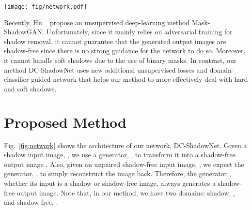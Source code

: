 \documentclass[10pt,twocolumn,letterpaper]{article}
\begin{document}
\begin{figure*}
	\vspace{-0.1in}
	\begin{center}
		\captionsetup[subfigure]{labelformat=empty}
		{\texttt{[image: fig/network.pdf]}}
		\vspace{-0.125in}
	\end{center}
	\vspace{-0.15in}
	\caption{\textbf{Network Architecture of Our DC-ShadowNet.} 
		We have two domains: shadow, , and shadow-free, . Our shadow removal generator is represented by . It consists of an encoder , a decoder , and a domain classifier . 
We also use a discriminator  that consists of its own encoder , a classifier  and a domain classifier .
For the input shadow image , its corresponding output shadow-free image is represented by . 
Also, for the unpaired input shadow-free image ,  reconstruct the image back.
		The domain classifiers,  and , are used to classify whether the inputs to their respective networks,  and , belong to shadow () or shadow-free () domain.
To guide our generator  to do shadow removal, other than adversarial loss from the discriminator , we include novel losses: shadow-free chromaticity loss  (purple) guided by the physics-based shadow-free chromaticity  obtained from ; shadow-robust feature loss  (red) guided by the shadow-robust perceptual features  obtained from , and boundary smoothness loss  (orange) guided by the boundary detection of our generated soft shadow mask .}
	\vspace{-0.1in}
	\label{fig:network}
\end{figure*}


Recently, Hu \etal~\cite{Hu19} propose an unsupervised deep-learning method Mask-ShadowGAN. Unfortunately, since it mainly relies on adversarial training for shadow removal, it cannot guarantee that the generated output images are shadow-free since there is no strong guidance for the network to do so. Moreover, it cannot handle soft shadows due to the use of binary masks. 
In contrast, our method DC-ShadowNet uses new additional unsupervised losses and domain-classifier guided network that helps our method to more effectively deal with hard and soft shadows.


\section{Proposed Method}
\label{sec:method}
Fig.~\ref{fig:network} shows the architecture of our network, DC-ShadowNet.  
Given a shadow input image, , we use a generator, , to transform it into a shadow-free output image . 
Also, given an unpaired shadow-free input image, , we expect the generator, , to simply  reconstruct the image back.
Therefore, the generator , whether its input is a shadow or shadow-free image,  always generates a shadow-free output image. 
Note that, in our method, we have two domains: shadow, , and shadow-free, . 
\end{document}
